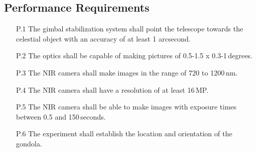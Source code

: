 \subsection{Performance Requirements}

\begin{enumerate}
    \item[P.1] The gimbal stabilization system shall point the telescope towards the celestial object with an accuracy of at least 1 arcsecond.
    \item[P.2] The optics shall be capable of making pictures of 0.5-1.5 x 0.3-1\,degrees.
    \item[P.3] The NIR camera shall make images in the range of 720 to 1200\,nm.
    \item[P.4] The NIR camera shall have a resolution of at least 16\,MP.
    \item[P.5] The NIR camera shall be able to make images with exposure times between 0.5 and 150\,seconds.
    \item[P.6] The experiment shall establish the location and orientation of the gondola.
\end{enumerate}
